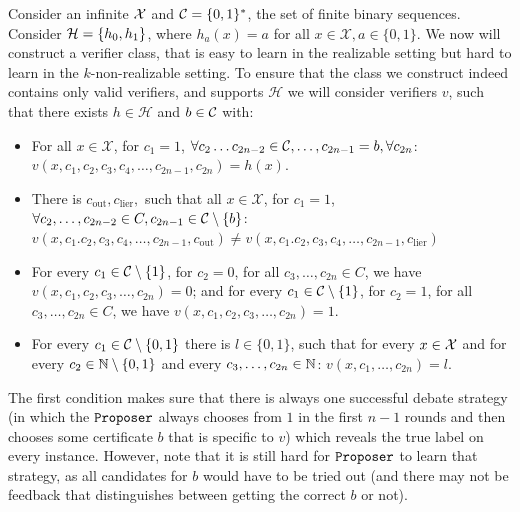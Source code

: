 \documentclass[anon]{alt2027} %
\begin{document}
    Consider an infinite ${\mathcal X}$ and ${{\mathcal C}} = \{0,1\}^*$, the set of finite binary sequences.  Consider ${{\mathcal H}} = \{h_0,h_1\}$, where $h_a(x) = a$ for all $x\in \mathcal{X}, a\in\{0,1\}$. 
    We now will construct a verifier class, that is easy to learn in the realizable setting but hard to learn in the $k$-non-realizable setting.
  To ensure that the class we construct indeed contains only valid  verifiers, and supports $\mathcal{H}$ we will consider verifiers $v$, such that there exists $h\in \mathcal{H}$ and $b\in {{\mathcal C}}$ with:
  \begin{itemize}
      \item For all $x \in \mathcal{X}$, for $c_1 =1$, $\forall c_2 \dots c_{2n-2}\in {{\mathcal C}}, \dots, c_{2n-1}= b, \forall c_{2n}  $: $v(x, c_1, c_2, c_3,c_4, \dots, c_{2n-1}, c_{2n}) = h(x) $.
      \item There is $c_{\mathrm{out}},c_{\mathrm{lier}}, $ such that all $x \in \mathcal{X}$, for $c_1 =1$, $\forall c_2, \dots, c_{2n-2} \in C,  c_{2n-1} \in {{\mathcal C}} \setminus \{b\}$: $v(x, c_1. c_2, c_3,c_4, \dots, c_{2n-1}, c_{\mathrm{out}}) \neq v(x, c_1. c_2, c_3,c_4, \dots, c_{2n-1}, c_{\mathrm{lier}}) $%
      \item For every $c_1 \in {{\mathcal C}} \setminus \{1\}$, for $c_2 = 0 $, for all $c_3, \dots, c_{2n} \in C$, we have $v(x,c_1, c_2, c_3, \dots, c_{2n}) = 0$; and for every $c_1 \in {{\mathcal C}} \setminus \{1\}$, for $c_2 = 1 $, for all $c_3, \dots, c_{2n} \in C$, we have $v(x,c_1, c_2, c_3, \dots, c_{2n}) = 1$. 
      \item For every $c_1\in {{\mathcal C}} \setminus \{0,1\}$ there is $l \in \{0,1\}$, such that for every $x\in{\mathcal X}$ and for every $c_2\in \mathbb{N} \setminus \{0,1\}$ and every $c_3, \dots, c_{2n} \in \mathbb{N}$: $v(x,c_1, \dots, c_{2n})= l $.
  \end{itemize}
    The first condition makes sure that there is always one successful debate strategy (in which the $\texttt{Proposer}$ always chooses from $1$ in the first $n-1$ rounds and then chooses some certificate $b$ that is specific to $v$) which reveals the true label on every instance. 
    However, note that it is still hard for $\texttt{Proposer}$ to learn that strategy, as all candidates for $b$ would have to be tried out (and there may not be feedback that distinguishes between getting the correct $b$ or not). 
    
\end{document}
